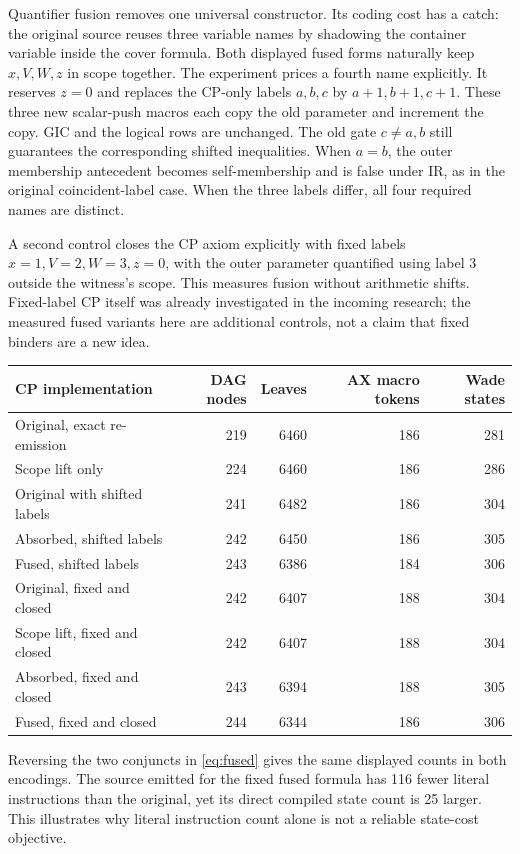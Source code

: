 \documentclass[11pt]{article}
\begin{document}
Quantifier fusion removes one universal constructor.  Its coding cost has a
catch: the original source reuses three variable names by shadowing the
container variable inside the cover formula.  Both displayed fused forms
naturally keep $x,V,W,z$ in scope together.  The experiment prices a fourth
name explicitly.  It reserves $z=0$ and replaces the CP-only labels
$a,b,c$ by $a+1,b+1,c+1$.  These three new scalar-push macros each copy the
old parameter and increment the copy.  GIC and the logical rows are unchanged.
The old gate $c\ne a,b$ still guarantees the corresponding shifted
inequalities.  When $a=b$, the outer membership antecedent becomes
self-membership and is false under IR, as in the original coincident-label
case.  When the three labels differ, all four required names are distinct.

A second control closes the CP axiom explicitly with fixed labels
$x=1,V=2,W=3,z=0$, with the outer parameter quantified using label 3 outside
the witness's scope.  This measures fusion without arithmetic shifts.
Fixed-label CP itself was already investigated in the incoming research;
the measured fused variants here are additional controls, not a claim that
fixed binders are a new idea.

\begin{center}\small
\begin{tabular}{@{}lrrrr@{}}
\toprule
CP implementation&DAG nodes&Leaves&AX macro tokens&Wade states\\
\midrule
Original, exact re-emission&219&6460&186&281\\
Scope lift only&224&6460&186&286\\
Original with shifted labels&241&6482&186&304\\
Absorbed, shifted labels&242&6450&186&305\\
Fused, shifted labels&243&6386&184&306\\
Original, fixed and closed&242&6407&188&304\\
Scope lift, fixed and closed&242&6407&188&304\\
Absorbed, fixed and closed&243&6394&188&305\\
Fused, fixed and closed&244&6344&186&306\\
\bottomrule
\end{tabular}
\end{center}
Reversing the two conjuncts in \eqref{eq:fused} gives the same displayed
counts in both encodings.  The source emitted for the fixed fused formula
has 116 fewer literal instructions than the original, yet its direct
compiled state count is 25 larger.  This illustrates why literal instruction
count alone is not a reliable state-cost objective.
\end{document}

